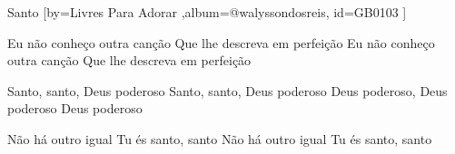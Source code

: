 \beginsong
{Santo %
}[by={Livres Para Adorar  %
},album={@walyssondosreis},
id={GB0103 %
}] 

\beginverse* 
Eu não conheço outra canção
Que lhe descreva em perfeição
Eu não conheço outra canção
Que lhe descreva em perfeição
\endverse

\beginchorus
Santo, santo, Deus poderoso
Santo, santo, Deus poderoso
Deus poderoso, Deus poderoso
Deus poderoso
\endchorus

\beginverse*
Não há outro igual
Tu és santo, santo
Não há outro igual
Tu és santo, santo
\endverse

\begin{comment}
\lstset{basicstyle=\scriptsize\bf} %
\tab{Solo 1}
\begin{lstlisting}
E|-----------------------------------------------------|
B|-----------------------------------------------------|
G|-----------------------------------------------------|
D|-----------------------------------------------------|
A|-----------------------------------------------------|
E|-----------------------------------------------------|
\end{lstlisting}
\end{comment}
\vspace{2em}
%
%
% 
% 
\endsong
\begin{comment}

\end{comment}